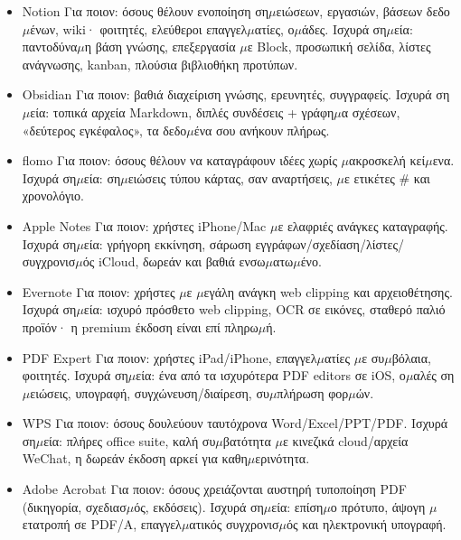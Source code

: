 \begin{itemize}
  \item Notion Για ποιον: όσους θέλουν ενοποίηση ση$\mu$ειώσεων, εργασιών, βάσεων δεδο$\mu$ένων, wiki· φοιτητές, ελεύθεροι επαγγελ$\mu$ατίες, ο$\mu$άδες. Ισχυρά ση$\mu$εία: παντοδύνα$\mu$η βάση γνώσης, επεξεργασία $\mu$ε Block, προσωπική σελίδα, λίστες ανάγνωσης, kanban, πλούσια βιβλιοθήκη προτύπων.
  \item Obsidian Για ποιον: βαθιά διαχείριση γνώσης, ερευνητές, συγγραφείς. Ισχυρά ση$\mu$εία: τοπικά αρχεία Markdown, διπλές συνδέσεις + γράφη$\mu$α σχέσεων, «δεύτερος εγκέφαλος», τα δεδο$\mu$ένα σου ανήκουν πλήρως.
  \item flomo Για ποιον: όσους θέλουν να καταγράφουν ιδέες χωρίς $\mu$ακροσκελή κεί$\mu$ενα. Ισχυρά ση$\mu$εία: ση$\mu$ειώσεις τύπου κάρτας, σαν αναρτήσεις, $\mu$ε ετικέτες \# και χρονολόγιο.
  \item Apple Notes Για ποιον: χρήστες iPhone/Mac $\mu$ε ελαφριές ανάγκες καταγραφής. Ισχυρά ση$\mu$εία: γρήγορη εκκίνηση, σάρωση εγγράφων/σχεδίαση/λίστες/συγχρονισ$\mu$ός iCloud, δωρεάν και βαθιά ενσω$\mu$ατω$\mu$ένο.
  \item Evernote Για ποιον: χρήστες $\mu$ε $\mu$εγάλη ανάγκη web clipping και αρχειοθέτησης. Ισχυρά ση$\mu$εία: ισχυρό πρόσθετο web clipping, OCR σε εικόνες, σταθερό παλιό προϊόν· η premium έκδοση είναι επί πληρω$\mu$ή.
\end{itemize}


\begin{itemize}
  \item PDF Expert Για ποιον: χρήστες iPad/iPhone, επαγγελ$\mu$ατίες $\mu$ε συ$\mu$βόλαια, φοιτητές. Ισχυρά ση$\mu$εία: ένα από τα ισχυρότερα PDF editors σε iOS, ο$\mu$αλές ση$\mu$ειώσεις, υπογραφή, συγχώνευση/διαίρεση, συ$\mu$πλήρωση φορ$\mu$ών.
  \item WPS Για ποιον: όσους δουλεύουν ταυτόχρονα Word/Excel/PPT/PDF. Ισχυρά ση$\mu$εία: πλήρες office suite, καλή συ$\mu$βατότητα $\mu$ε κινεζικά cloud/αρχεία WeChat, η δωρεάν έκδοση αρκεί για καθη$\mu$ερινότητα.
  \item Adobe Acrobat Για ποιον: όσους χρειάζονται αυστηρή τυποποίηση PDF (δικηγορία, σχεδιασ$\mu$ός, εκδόσεις). Ισχυρά ση$\mu$εία: επίση$\mu$ο πρότυπο, άψογη $\mu$ετατροπή σε PDF/A, επαγγελ$\mu$ατικός συγχρονισ$\mu$ός και ηλεκτρονική υπογραφή.
\end{itemize}


